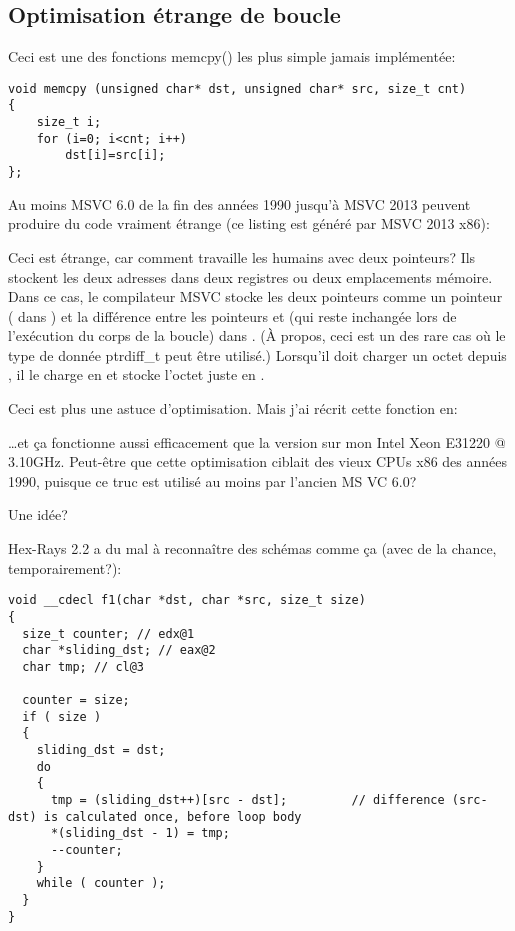 \subsection{Optimisation étrange de boucle}

Ceci est une des fonctions memcpy() les plus simple jamais implémentée:

\begin{lstlisting}[style=customc]
void memcpy (unsigned char* dst, unsigned char* src, size_t cnt)
{
	size_t i;
	for (i=0; i<cnt; i++)
		dst[i]=src[i];
};
\end{lstlisting}

Au moins MSVC 6.0 de la fin des années 1990 jusqu'à MSVC 2013 peuvent produire du
code vraiment étrange (ce listing est généré par MSVC 2013 x86):



Ceci est étrange, car comment travaille les humains avec deux pointeurs? Ils stockent
les deux adresses dans deux registres ou deux emplacements mémoire.
Dans ce cas, le compilateur MSVC stocke les deux pointeurs comme un pointeur ( dans \EAX)
et la différence entre les pointeurs  et  (qui reste inchangée lors
de l'exécution du corps de la boucle) dans \ESI.
(À propos, ceci est un des rare cas où le type de donnée ptrdiff\_t peut être utilisé.)
Lorsqu'il doit charger un octet depuis , il le charge en 
et stocke l'octet juste en .

Ceci est plus une astuce d'optimisation. Mais j'ai récrit cette fonction en:



\dots et ça fonctionne aussi efficacement que la version  sur mon Intel
Xeon E31220 @ 3.10GHz.
Peut-être que cette optimisation ciblait des vieux CPUs x86 des années 1990, puisque
ce truc est utilisé au moins par l'ancien MS VC 6.0?

Une idée?

Hex-Rays 2.2 a du mal à reconnaître des schémas comme ça (avec de la chance, temporairement?):

\begin{lstlisting}[style=customc]
void __cdecl f1(char *dst, char *src, size_t size)
{
  size_t counter; // edx@1
  char *sliding_dst; // eax@2
  char tmp; // cl@3

  counter = size;
  if ( size )
  {
    sliding_dst = dst;
    do
    {
      tmp = (sliding_dst++)[src - dst];         // difference (src-dst) is calculated once, before loop body
      *(sliding_dst - 1) = tmp;
      --counter;
    }
    while ( counter );
  }
}
\end{lstlisting}

